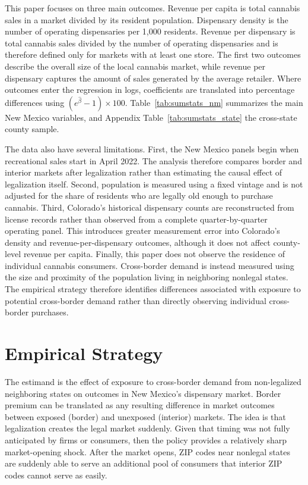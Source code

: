 \documentclass[12pt]{article}
\begin{document}
This paper focuses on three main outcomes. Revenue per capita is total cannabis sales in a market divided by its resident population. Dispensary density is the number of operating dispensaries per 1,000 residents. Revenue per dispensary is total cannabis sales divided by the number of operating dispensaries and is therefore defined only for markets with at least one store. The first two outcomes describe the overall size of the local cannabis market, while revenue per dispensary captures the amount of sales generated by the average retailer. Where outcomes enter the regression in logs, coefficients are translated into percentage differences using $(e^{\hat\beta}-1)\times100$. Table~\ref{tab:sumstats_nm} summarizes the main New Mexico variables, and Appendix Table~\ref{tab:sumstats_state} the cross-state county sample. 





The data also have several limitations. First, the New Mexico panels begin when recreational sales start in April 2022. The analysis therefore compares border and interior markets after legalization rather than estimating the causal effect of legalization itself. Second, population is measured using a fixed vintage and is not adjusted for the share of residents who are legally old enough to purchase cannabis. Third, Colorado's historical dispensary counts are reconstructed from license records rather than observed from a complete quarter-by-quarter operating panel. This introduces greater measurement error into Colorado's density and revenue-per-dispensary outcomes, although it does not affect county-level revenue per capita. Finally, this paper does not observe the residence of individual cannabis consumers. Cross-border demand is instead measured using the size and proximity of the population living in neighboring nonlegal states. The empirical strategy therefore identifies differences associated with exposure to potential cross-border demand rather than directly observing individual cross-border purchases.

\section{Empirical Strategy}
\label{sec:empirical}

The estimand is the effect of exposure to
cross-border demand from non-legalized neighboring states on outcomes in
New Mexico's dispensary market. Border premium can be translated as any
resulting difference in market outcomes between exposed (border) and unexposed (interior) markets. The idea is that legalization creates the legal market suddenly. Given that timing was not fully anticipated by firms or consumers, then the policy provides a relatively sharp market-opening shock. After the market opens, ZIP codes near nonlegal states are suddenly able to serve an additional pool of consumers that interior ZIP codes cannot serve as easily.
\end{document}
